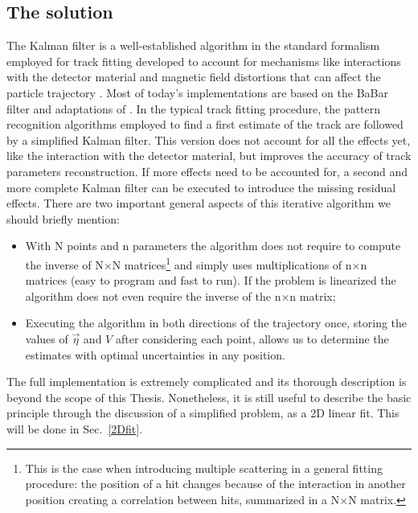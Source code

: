\begin{refsection}
\section{The solution}
    The Kalman filter is a well-established algorithm in the standard formalism employed for track fitting developed to account for mechanisms like interactions with the detector material and magnetic field distortions that can affect the particle trajectory \cite{Kalman:1984}\cite{Kalman:1987}. 
    Most of today's implementations are based on the BaBar filter and adaptations of \cite{Kalman}\cite{Kalman:1987}.
    In the typical track fitting procedure, the pattern recognition algorithms employed to find a first estimate of the track are followed by a simplified Kalman filter. 
    This version does not account for all the effects yet, like the interaction with the detector material, but improves the accuracy of track parameters reconstruction. 
    If more effects need to be accounted for, a second and more complete Kalman filter can be executed to introduce the missing residual effects. 
    There are two important general aspects of this iterative algorithm we should briefly mention: 
    \begin{itemize}
        \item With N points and n parameters the algorithm does not require to compute the inverse of N$\times$N matrices\footnote{This is the case when introducing multiple scattering in a general fitting procedure: the position of a hit changes because of the interaction in another position creating a correlation between hits, summarized in a N$\times$N matrix.} and simply uses multiplications of n$\times$n matrices (easy to program and fast to run).
        If the problem is linearized the algorithm does not even require the inverse of the n$\times$n matrix;
        \item Executing the algorithm in both directions of the trajectory once, storing the values of $\vec{\eta}$ and $V$ after considering each point, allows us to determine the estimates with optimal uncertainties in any position.
    \end{itemize} 
    The full implementation is extremely complicated and its thorough description is beyond the scope of this Thesis. 
    Nonetheless, it is still useful to describe the basic principle through the discussion of a simplified problem, as a 2D linear fit. 
    This will be done in Sec.~\ref{2Dfit}.


\end{refsection}
